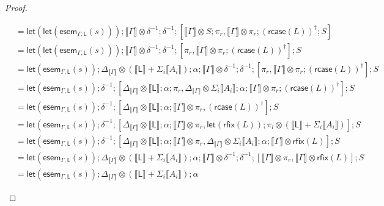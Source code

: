 \documentclass[acmsmall,screen,review]{acmart}
\newcommand{\ms}[1]{\ensuremath{\mathsf{#1}}}
\newcommand{\dnt}[1]{\llbracket{#1}\rrbracket}
\newcommand{\dmor}[1]{{\Delta}_{#1}}
\newcommand{\entrymor}[3]{\ms{esem}_{#1, #3}(#2)}
\newcommand{\lmor}[1]{\ms{let}(#1)}
\newcommand{\rcase}[1]{\ms{rcase}(#1)}
\newcommand{\rfix}[1]{\ms{rfix}(#1)}
\begin{document}
\begin{proof}
\begin{itemize}[leftmargin=*]
\begin{equation}
\begin{aligned}
        & = \lmor{\lmor{\entrymor{\Gamma}{s}{\ms{L}}}} ; \dnt{\Gamma} \otimes \delta^{-1}
          ; \delta^{-1}
          ; [
              \dnt{\Gamma} \otimes S ; \pi_r, 
              \dnt{\Gamma} \otimes \pi_r ; (\rcase{L})^\dagger ; S
            ] \\
          & = \lmor{\lmor{\entrymor{\Gamma}{s}{\ms{L}}}} 
            ; \dnt{\Gamma} \otimes \delta^{-1} ; \delta^{-1}
            ; [\pi_r, \dnt{\Gamma} \otimes \pi_r ; (\rcase{L})^\dagger]
            ; S \\
        & = \lmor{\entrymor{\Gamma}{s}{\ms{L}}} 
          ; \dmor{\dnt{\Gamma}} \otimes (\dnt{\ms{L}} + \Sigma_i\dnt{A_i}) ; \alpha 
          ; \dnt{\Gamma} \otimes \delta^{-1} ; \delta^{-1}
          ; [\pi_r, \dnt{\Gamma} \otimes \pi_r ; (\rcase{L})^\dagger] ; S 
          \\
        & = \lmor{\entrymor{\Gamma}{s}{\ms{L}}} ; \delta^{-1} ; [
              \Delta_{\dnt{\Gamma}} \otimes \dnt{\ms{L}} ; \alpha ; \pi_r, 
              \Delta_{\dnt{\Gamma}} \otimes \Sigma_i\dnt{A_i}  
                ; \alpha ; \dnt{\Gamma} \otimes \pi_r ; (\rcase{L})^\dagger
            ]
          ; S \\
        & = \lmor{\entrymor{\Gamma}{s}{\ms{L}}} ; \delta^{-1} ; [
              \Delta_{\dnt{\Gamma}} \otimes \dnt{\ms{L}} ; \alpha ; \dnt{\Gamma} \otimes \pi_r, 
              (\rcase{L})^\dagger
            ]
          ; S \\
        & = \lmor{\entrymor{\Gamma}{s}{\ms{L}}} ; \delta^{-1} ; [
              \Delta_{\dnt{\Gamma}} \otimes \dnt{\ms{L}} ; \alpha ; \dnt{\Gamma} \otimes \pi_r, 
              \lmor{\rfix{L}} ; \pi_l \otimes (\dnt{\ms{L}} + \Sigma_i\dnt{A_i})
            ]
          ; S \\
        & = \lmor{\entrymor{\Gamma}{s}{\ms{L}}} ; \delta^{-1} ; [
              \Delta_{\dnt{\Gamma}} \otimes \dnt{\ms{L}} ; \alpha ; \dnt{\Gamma} \otimes \pi_r, 
              \Delta_{\dnt{\Gamma}} \otimes \Sigma_i\dnt{A_i} ; \alpha 
                ; \dnt{\Gamma} \otimes \rfix{L}
            ]
          ; S \\
        & = \lmor{\entrymor{\Gamma}{s}{\ms{L}}} 
          ; \Delta_{\dnt{\Gamma}} \otimes (\dnt{\ms{L}} + \Sigma_i\dnt{A_i}) ; \alpha
          ; \dnt{\Gamma} \otimes \delta^{-1} ; \delta^{-1}
          ; [
              \dnt{\Gamma} \otimes \pi_r, 
              \dnt{\Gamma} \otimes \rfix{L}
            ]
          ; S \\
        & = \lmor{\entrymor{\Gamma}{s}{\ms{L}}} 
          ; \Delta_{\dnt{\Gamma}} \otimes (\dnt{\ms{L}} + \Sigma_i\dnt{A_i}) ; \alpha

\end{aligned}
\end{equation}
\end{itemize}
\end{proof}
\end{document}
